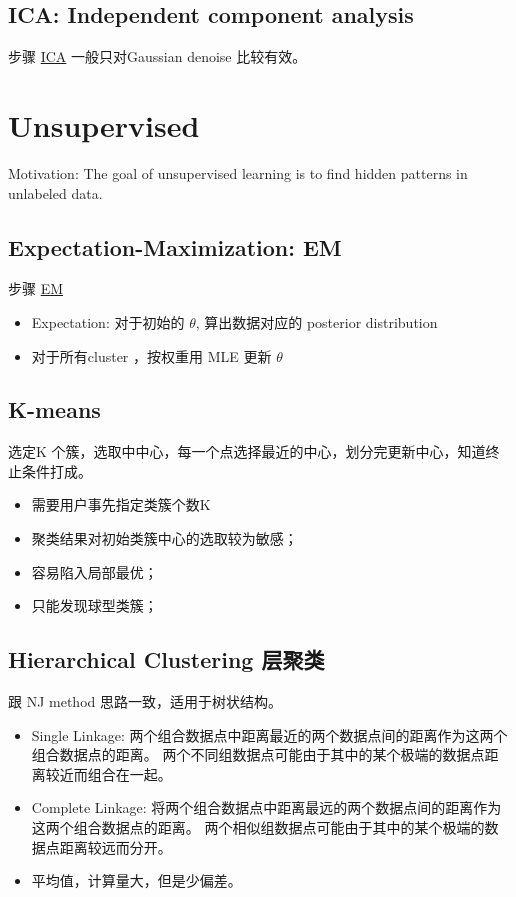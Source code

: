 \documentclass[12pt]{article}
\numberwithin{theorem}{section} %
\numberwithin{definition}{section} %
\numberwithin{assumption}{section} %
\numberwithin{lemma}{section} %
\numberwithin{remark}{section} %
\numberwithin{prop}{section} %
\numberwithin{corollary}{section} %
\numberwithin{example}{section} %
\numberwithin{question}{section} %
\numberwithin{problem}{section} %
\numberwithin{conjecture}{section} %
\numberwithin{append}{section} %
\numberwithin{property}{section} %
\begin{document}
\begin{CJK}{UTF8}{gbsn}
\subsection{ICA: Independent component analysis}
步骤 \href{https://www.cnblogs.com/jerrylead/archive/2011/04/19/2021071.html}{ICA} 
一般只对Gaussian denoise 比较有效。


\section{Unsupervised}
Motivation: The goal of unsupervised learning is to find hidden patterns in unlabeled data.

\subsection{Expectation-Maximization: EM}
步骤 \href{https://zhuanlan.zhihu.com/p/78311644}{EM} 

\begin{itemize}
	\item Expectation: 对于初始的 $\theta$, 算出数据对应的 posterior distribution
	\item 对于所有cluster ，按权重用 MLE 更新 $\theta$
\end{itemize}

\subsection{K-means}
选定K 个簇，选取中中心，每一个点选择最近的中心，划分完更新中心，知道终止条件打成。

\begin{itemize}
	\item 需要用户事先指定类簇个数K
	\item 聚类结果对初始类簇中心的选取较为敏感；
	\item 容易陷入局部最优； 
	\item 只能发现球型类簇；
\end{itemize}

\subsection{Hierarchical Clustering 层聚类}

跟 NJ method 思路一致，适用于树状结构。
\begin{itemize}
	\item Single Linkage: 两个组合数据点中距离最近的两个数据点间的距离作为这两个组合数据点的距离。 两个不同组数据点可能由于其中的某个极端的数据点距离较近而组合在一起。
	\item Complete Linkage: 将两个组合数据点中距离最远的两个数据点间的距离作为这两个组合数据点的距离。 两个相似组数据点可能由于其中的某个极端的数据点距离较远而分开。
	\item 平均值，计算量大，但是少偏差。
\end{itemize}


\end{CJK}
\end{document}
